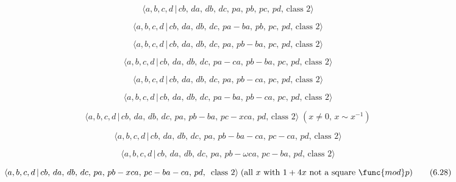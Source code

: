 \documentclass[10pt]{article}
\begin{document}
\begin{equation}
\langle a,b,c,d\,|\,cb,\,da,\,db,\,dc,\,pa,\,pb,\,pc,\,pd,\,\text{class }%
2\rangle  \tag{6.19}
\end{equation}

\begin{equation}
\langle a,b,c,d\,|\,cb,\,da,\,db,\,dc,\,pa-ba,\,pb,\,pc,\,pd,\,\text{class }%
2\rangle  \tag{6.20}
\end{equation}

\begin{equation}
\langle a,b,c,d\,|\,cb,\,da,\,db,\,dc,\,pa,\,pb-ba,\,pc,\,pd,\,\text{class }%
2\rangle  \tag{6.21}
\end{equation}

\begin{equation}
\langle a,b,c,d\,|\,cb,\,da,\,db,\,dc,\,pa-ca,\,pb-ba,\,pc,\,pd,\,\text{
class }2\rangle  \tag{6.22}
\end{equation}

\begin{equation}
\langle a,b,c,d\,|\,cb,\,da,\,db,\,dc,\,pa,\,pb-ca,\,pc,\,pd,\,\text{class }%
2\rangle  \tag{6.23}
\end{equation}

\begin{equation}
\langle a,b,c,d\,|\,cb,\,da,\,db,\,dc,\,pa-ba,\,pb-ca,\,pc,\,pd,\,\text{
class }2\rangle  \tag{6.24}
\end{equation}

\begin{equation}
\langle a,b,c,d\,|\,cb,\,da,\,db,\,dc,\,pa,\,pb-ba,\,pc-xca,\,pd,\,\text{
class }2\rangle \;(x\neq 0,\,x\sim x^{-1})  \tag{6.25}
\end{equation}

\begin{equation}
\langle a,b,c,d\,|\,cb,\,da,\,db,\,dc,\,pa,\,pb-ba-ca,\,pc-ca,\,pd,\,\text{
class }2\rangle  \tag{6.26}
\end{equation}

\begin{equation}
\langle a,b,c,d\,|\,cb,\,da,\,db,\,dc,\,pa,\,pb-\omega ca,\,pc-ba,\,pd,\,%
\text{class }2\rangle  \tag{6.27}
\end{equation}

\begin{equation}
\langle a,b,c,d\,|\,cb,\,da,\,db,\,dc,\,pa,\,pb-xca,\,pc-ba-ca,\,pd,\,\text{
class }2\rangle \;(\text{all }x\text{ with }1+4x\text{ not a square }\func{%
mod}p)  \tag{6.28}
\end{equation}
\end{document}
